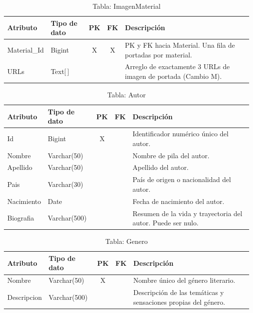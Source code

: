 \documentclass[12pt,a4paper]{article}
\begin{document}
\begin{table}[H]
\centering
\begin{tabularx}{\textwidth}{|l|l|c|c|X|}
\hline
\textbf{Atributo} & \textbf{Tipo de dato} & \textbf{PK} & \textbf{FK} & \textbf{Descripción} \\ \hline
Material\_Id & Bigint  & X & X & PK y FK hacia Material. Una fila de portadas por material. \\ \hline
URLs         & Text[\,] & & & Arreglo de exactamente 3 URLs de imagen de portada (Cambio M). \\ \hline
\end{tabularx}
\caption{Tabla: ImagenMaterial}
\end{table}

\begin{table}[H]
\centering
\begin{tabularx}{\textwidth}{|l|l|c|c|X|}
\hline
\textbf{Atributo} & \textbf{Tipo de dato} & \textbf{PK} & \textbf{FK} & \textbf{Descripción} \\ \hline
Id         & Bigint       & X & & Identificador numérico único del autor. \\ \hline
Nombre     & Varchar(50)  & & & Nombre de pila del autor. \\ \hline
Apellido   & Varchar(50)  & & & Apellido del autor. \\ \hline
Pais       & Varchar(30)  & & & País de origen o nacionalidad del autor. \\ \hline
Nacimiento & Date         & & & Fecha de nacimiento del autor. \\ \hline
Biografia  & Varchar(500) & & & Resumen de la vida y trayectoria del autor. Puede ser nulo. \\ \hline
\end{tabularx}
\caption{Tabla: Autor}
\end{table}

\begin{table}[H]
\centering
\begin{tabularx}{\textwidth}{|l|l|c|c|X|}
\hline
\textbf{Atributo} & \textbf{Tipo de dato} & \textbf{PK} & \textbf{FK} & \textbf{Descripción} \\ \hline
Nombre      & Varchar(50)  & X & & Nombre único del género literario. \\ \hline
Descripcion & Varchar(500) & & & Descripción de las temáticas y sensaciones propias del género. \\ \hline
\end{tabularx}
\caption{Tabla: Genero}
\end{table}
\end{document}
